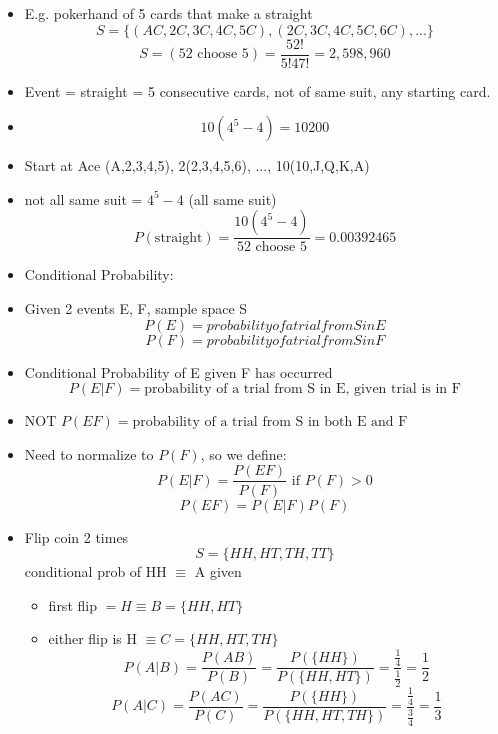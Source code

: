\begin{itemize}
      \item E.g. pokerhand of 5 cards that make a straight
            \[ S = \{ (AC, 2C, 3C, 4C, 5C), (2C, 3C, 4C, 5C, 6C), ...\}\]
            \[ S = (52 \text{ choose } 5) = \frac{52!}{5! 47!} = 2,598,960\]
      \item Event = straight = 5 consecutive cards, not of same suit, any starting card.
      \item \[ 10 ( 4^5 - 4) = 10200\]
      \item Start at Ace (A,2,3,4,5), 2(2,3,4,5,6), ..., 10(10,J,Q,K,A)
      \item not all same suit = $4^5 - 4$ (all same suit)
            \[ P (\text{straight}) = \frac{10(4^5 - 4)}{52 \text{ choose } 5} = 0.00392465\]
      \item Conditional Probability:
      \item Given 2 events E, F, sample space S
            \[ P(E) = probability of  a trial from S in E \]
            \[ P(F) = probability of a trial from S in F \]
      \item Conditional Probability of E given F has occurred
            \[ P(E|F) = \text{probability of a trial from S in E, given trial is in F} \]
      \item NOT $P(EF) = \text{probability of a trial from S in both E and F} $
      \item Need to normalize to $P(F)$, so we define:
            \[ P(E|F) = \frac{P(EF)}{P(F)} \text{ if } P(F) > 0\]
            \[ P(EF) = P(E|F) P(F)\]
      \item Flip coin 2 times
            \[ S = \{HH, HT, TH, TT\}\]
            conditional prob of HH $\equiv$ A
            given
            \begin{itemize}
                  \item first flip $= H \equiv B = \{HH, HT\}$
                  \item either flip is H $\equiv C = \{HH, HT, TH\}$
                        \[ P(A|B) = \frac{P(A B)}{P(B)} = \frac{P(\{HH\})}{P(\{HH, HT\})} = \frac{\frac{1}{4}}{\frac{1}{2}} = \frac{1}{2}\]
                        \[ P(A|C) = \frac{P(A C)}{P(C)} = \frac{P(\{HH\})}{P(\{HH, HT, TH\})} = \frac{\frac{1}{4}}{\frac{3}{4}} = \frac{1}{3}\]
            \end{itemize}
\end{itemize}
